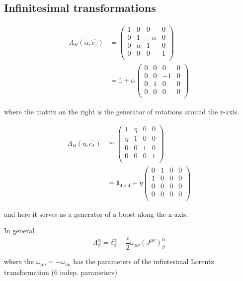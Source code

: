 \documentclass[11pt]{article}
\begin{document}
	\subsection*{Infinitesimal transformations}
	\begin{align*}
		\Lambda_R(\alpha, \hat{e_z}) & = \begin{pmatrix}
			1 & 0 & 0 & 0\\
			0 & 1 & -\alpha & 0\\
			0 & \alpha & 1 & 0\\
			0 & 0 & 0 & 1\\
		\end{pmatrix}\\	
	& = \mathbb{1} + \alpha \begin{pmatrix}
		0 & 0 &0& 0\\
		0 & 0 & -1 & 0\\
		0 & 1 & 0 & 0 \\
		0 & 0& 0& 0\\
	\end{pmatrix}
	\end{align*}
	 

where the matrix on the right is the generator of rotations around the z-axis.

\begin{align*}
	\Lambda_B (\eta, \hat{e_1}) & \simeq \begin{pmatrix}
		1 & \eta & 0 & 0\\
		\eta & 1 & 0 & 0\\
		0 & 0 & 1 & 0\\
		0 & 0&  0 & 1\\
	\end{pmatrix}\\
		& = \mathbb{1}_{4\times 4} + \eta \begin{pmatrix}
		0 & 1 & 0 & 0\\
		1 & 0 & 0 & 0\\
		0 & 0 & 0 & 0\\
		0 & 0 & 0 & 0\\
	\end{pmatrix}
\end{align*}


and here it serves as a generator  of a boost along the x-axis.

In general \[ \Lambda^\alpha_\beta = \delta^\alpha_\beta - \frac{i}{2} \omega_{\mu\nu} (J^{\mu\nu})^\alpha_\beta\]

where the $\omega_{\mu\nu} = - \omega_{\nu\mu}$ has the parameters of the infintesimal Lorentz transformation (6 indep. parameters)
\end{document}
